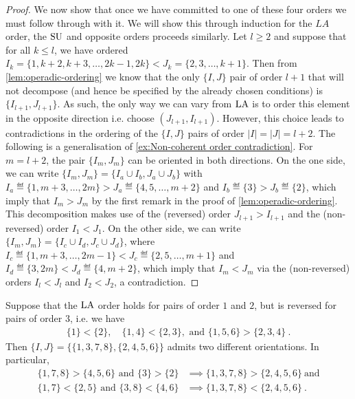 \begin{proof}
We now show that once we have committed to one of these four orders we must follow through with it.
We will show this through induction for the $LA$ order, the $\mathrm{SU}$ and opposite orders proceeds similarly.
Let $l\geq 2$ and suppose that for all $k\leq l$, we have ordered $I_k=\{1,k+2,k+3,\dots,2k-1,2k\} < J_k=\{2,3,\dots,k+1\}$.
Then from \cref{lem:operadic-ordering} we know that the only $\{I,J\}$ pair of order $l+1$ that will not decompose (and hence be specified by the already chosen conditions) is $\{I_{l+1},J_{l+1}\}$.
As such, the only way we can vary from $\mathrm{LA}$ is to order this element in the opposite direction i.e. choose $(J_{l+1},I_{l+1})$.
However, this choice leads to contradictions in the ordering of the $\{I,J\}$ pairs of order $|I|=|J|=l+2$.
The following is a generalisation of \cref{ex:Non-coherent order contradiction}.
For $m = l+2$, the pair $\{I_m,J_m\}$ can be oriented in both directions.
On the one side, we can write $\{I_m,J_m\} = \{I_a \cup I_b, J_a \cup J_b\}$ with $I_a \eqdef  \{1,m+3,\dots,2m\} > J_a \eqdef  \{4,5,\dots,m+2\}$  and $I_b \eqdef \{3\} > J_b \eqdef  \{2\}$, which imply that $I_m > J_m$ by the first remark in the proof of \cref{lem:operadic-ordering}. 
This decomposition makes use of the (reversed) order $J_{l+1} > I_{l+1}$ and the (non-reversed) order $I_1 < J_1$.
On the other side, we can write $\{I_m,J_m\} = \{I_c \cup I_d, J_c \cup J_d\}$, where $I_c \eqdef  \{1,m+3,\dots,  2m-1\} < J_c \eqdef  \{2,5,\dots,m+1\}$ and $I_d \eqdef \{3, 2m\} < J_d \eqdef  \{4, m+2\}$, which imply that $I_m < J_m$ via the (non-reversed) orders $I_l < J_l$ and $I_2 < J_2$, a contradiction.
\end{proof}

\begin{example} 
\label{ex:Non-coherent order contradiction}
Suppose that the $\mathrm{LA}$ order holds for pairs of order $1$ and $2$, but is reversed for pairs of order $3$, i.e. we have 
\begin{align*}
    \{1\}<\{2\},\quad \{1,4\}< \{2,3\}, \text{ and } \{1, 5, 6 \} > \{2, 3, 4\} \ .
\end{align*}
Then $\{I,J\}=\{\{1, 3, 7, 8\}, \{2, 4, 5, 6\}\}$ admits two different orientations.
In particular, 
\begin{align*}
    \{1, 7, 8\} > \{ 4, 5, 6 \} \text{ and } \{3\} > \{2\} &\implies \{1, 3, 7, 8\} >\{2, 4, 5, 6\} \ \text{and} \\
    \{1, 7\}< \{2, 5\} \text{ and } \{3, 8\}< \{4, 6\} &\implies \{1, 3, 7, 8\} <\{2, 4, 5, 6\} \ .
\end{align*}
\end{example}

